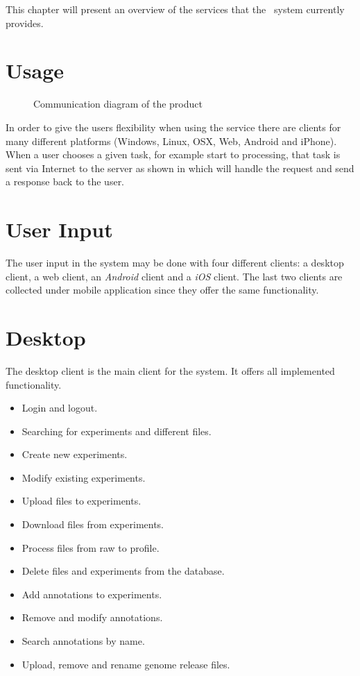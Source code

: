 


This chapter will present an overview of the services that the \appName\ system currently provides. 

\section{Usage}



\begin{figure}[h]
\caption{Communication diagram of the product}
\label{fig:con_serviceDescription}
\end{figure}
	
In order to give the users flexibility when using the service there are clients for many different platforms (Windows, Linux, OSX, Web, Android and iPhone). 
When a user chooses a given task, for example start  to  processing, that task is sent via Internet to the server as shown in  which will handle the request and send a response back to the user.

\section{User Input}
The user input in the \appName system may be done with four different clients: a desktop client, a web client, an \textit{Android} client and a \textit{iOS} client. The last two clients are collected under mobile application since they offer the same functionality.

\section{Desktop}
The desktop client is the main client for the \appName system. It offers all implemented functionality. 
\begin{itemize}
\item Login and logout.
\item Searching for experiments and different files.
\item Create new experiments.
\item Modify existing experiments.
\item Upload files to experiments.
\item Download files from experiments.
\item Process files from raw to profile.
\item Delete files and experiments from the database.
\item Add annotations to experiments.
\item Remove and modify annotations.
\item Search annotations by name.
\item Upload, remove and rename genome release files.
\end{itemize}

